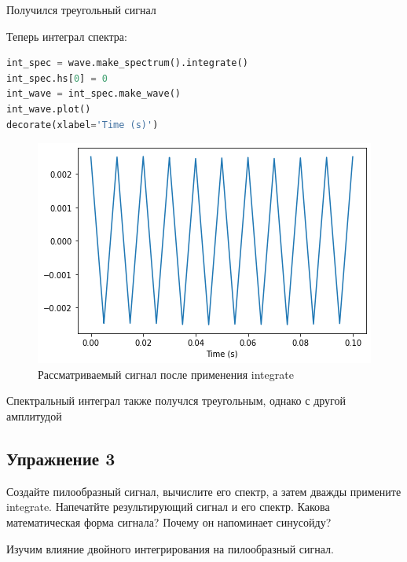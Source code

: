 Получился треугольный сигнал

Теперь интеграл спектра:

\begin{lstlisting}[language=Python]
int_spec = wave.make_spectrum().integrate()
int_spec.hs[0] = 0
int_wave = int_spec.make_wave()
int_wave.plot()
decorate(xlabel='Time (s)')
\end{lstlisting}
\begin{figure}[H]
	\begin{center}
		\includegraphics[scale=1]{fig/lab09/lab09_6.png}
		\caption{Рассматриваемый сигнал после применения integrate}
	\end{center}
\end{figure}

Спектральный интеграл также получлся треугольным, однако с другой амплитудой

\subsection{Упражнение 3}

Создайте пилообразный сигнал, вычислите его спектр, а затем дважды примените integrate. Напечатйте результирующий сигнал и его спектр. Какова математическая форма сигнала? Почему он напоминает синусойду?

Изучим влияние двойного интегрирования на пилообразный сигнал.

